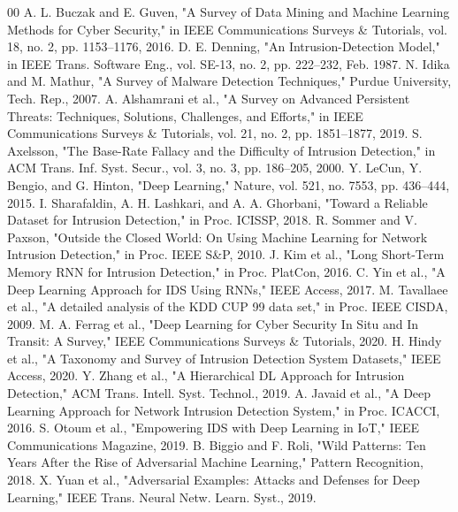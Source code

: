 \documentclass[10pt, conference, compsocconf, letterpaper, twocolumn, twoside]{IEEEtran}
\begin{document}
\begin{thebibliography}{00}
 A. L. Buczak and E. Guven, "A Survey of Data Mining and Machine Learning Methods for Cyber Security," in IEEE Communications Surveys \& Tutorials, vol. 18, no. 2, pp. 1153--1176, 2016.
 D. E. Denning, "An Intrusion-Detection Model," in IEEE Trans. Software Eng., vol. SE-13, no. 2, pp. 222--232, Feb. 1987.
 N. Idika and M. Mathur, "A Survey of Malware Detection Techniques," Purdue University, Tech. Rep., 2007.
 A. Alshamrani et al., "A Survey on Advanced Persistent Threats: Techniques, Solutions, Challenges, and Efforts," in IEEE Communications Surveys \& Tutorials, vol. 21, no. 2, pp. 1851--1877, 2019.
 S. Axelsson, "The Base-Rate Fallacy and the Difficulty of Intrusion Detection," in ACM Trans. Inf. Syst. Secur., vol. 3, no. 3, pp. 186--205, 2000.
 Y. LeCun, Y. Bengio, and G. Hinton, "Deep Learning," Nature, vol. 521, no. 7553, pp. 436--444, 2015.
 I. Sharafaldin, A. H. Lashkari, and A. A. Ghorbani, "Toward a Reliable Dataset for Intrusion Detection," in Proc. ICISSP, 2018.
 R. Sommer and V. Paxson, "Outside the Closed World: On Using Machine Learning for Network Intrusion Detection," in Proc. IEEE S\&P, 2010.
 J. Kim et al., "Long Short-Term Memory RNN for Intrusion Detection," in Proc. PlatCon, 2016.
 C. Yin et al., "A Deep Learning Approach for IDS Using RNNs," IEEE Access, 2017.
 M. Tavallaee et al., "A detailed analysis of the KDD CUP 99 data set," in Proc. IEEE CISDA, 2009.
 M. A. Ferrag et al., "Deep Learning for Cyber Security In Situ and In Transit: A Survey," IEEE Communications Surveys \& Tutorials, 2020.
 H. Hindy et al., "A Taxonomy and Survey of Intrusion Detection System Datasets," IEEE Access, 2020.
 Y. Zhang et al., "A Hierarchical DL Approach for Intrusion Detection," ACM Trans. Intell. Syst. Technol., 2019.
 A. Javaid et al., "A Deep Learning Approach for Network Intrusion Detection System," in Proc. ICACCI, 2016.
 S. Otoum et al., "Empowering IDS with Deep Learning in IoT," IEEE Communications Magazine, 2019.
 B. Biggio and F. Roli, "Wild Patterns: Ten Years After the Rise of Adversarial Machine Learning," Pattern Recognition, 2018.
 X. Yuan et al., "Adversarial Examples: Attacks and Defenses for Deep Learning," IEEE Trans. Neural Netw. Learn. Syst., 2019.
\end{thebibliography}
\end{document}
